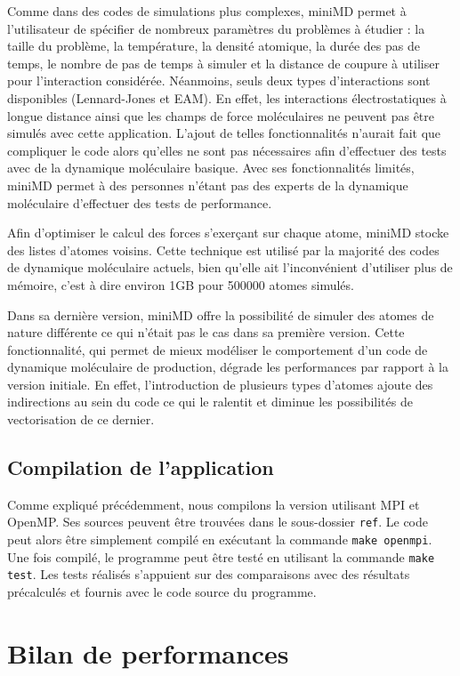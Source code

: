 \documentclass[11pt,a4paper]{article}
\begin{document}
	Comme dans des codes de simulations plus complexes, miniMD permet à l'utilisateur de spécifier de nombreux paramètres du problèmes à étudier : la taille du problème, la température, la densité atomique, la durée des pas de temps, le nombre de pas de temps à simuler et la distance de coupure à utiliser pour l'interaction considérée. Néanmoins, seuls deux types d'interactions sont disponibles (Lennard-Jones et EAM). En effet, les interactions électrostatiques à longue distance ainsi que les champs de force moléculaires ne peuvent pas être simulés avec cette application. L'ajout de telles fonctionnalités n'aurait fait que compliquer le code alors qu'elles ne sont pas nécessaires afin d'effectuer des tests avec de la dynamique moléculaire basique. Avec ses fonctionnalités limités, miniMD permet à des personnes n'étant pas des experts de la dynamique moléculaire d'effectuer des tests de performance.

	Afin d'optimiser le calcul des forces s'exerçant sur chaque atome, miniMD stocke des listes d'atomes voisins. Cette technique est utilisé par la majorité des codes de dynamique moléculaire actuels, bien qu'elle ait l'inconvénient d'utiliser plus de mémoire, c'est à dire environ 1GB pour 500000 atomes simulés.

	Dans sa dernière version, miniMD offre la possibilité de simuler des atomes de nature différente ce qui n'était pas le cas dans sa première version. Cette fonctionnalité, qui permet de mieux modéliser le comportement d'un code de dynamique moléculaire de production, dégrade les performances par rapport à la version initiale. En effet, l'introduction de plusieurs types d'atomes ajoute des indirections au sein du code ce qui le ralentit et diminue les possibilités de vectorisation de ce dernier.

	\subsection{Compilation de l'application}
		Comme expliqué précédemment, nous compilons la version utilisant MPI et OpenMP. Ses sources peuvent être trouvées dans le sous-dossier \texttt{ref}. Le code peut alors être simplement compilé en exécutant la commande \texttt{make openmpi}. Une fois compilé, le programme peut être testé en utilisant la commande \texttt{make test}. Les tests réalisés s'appuient sur des comparaisons avec des résultats précalculés et fournis avec le code source du programme.
\section{Bilan de performances}
\end{document}
